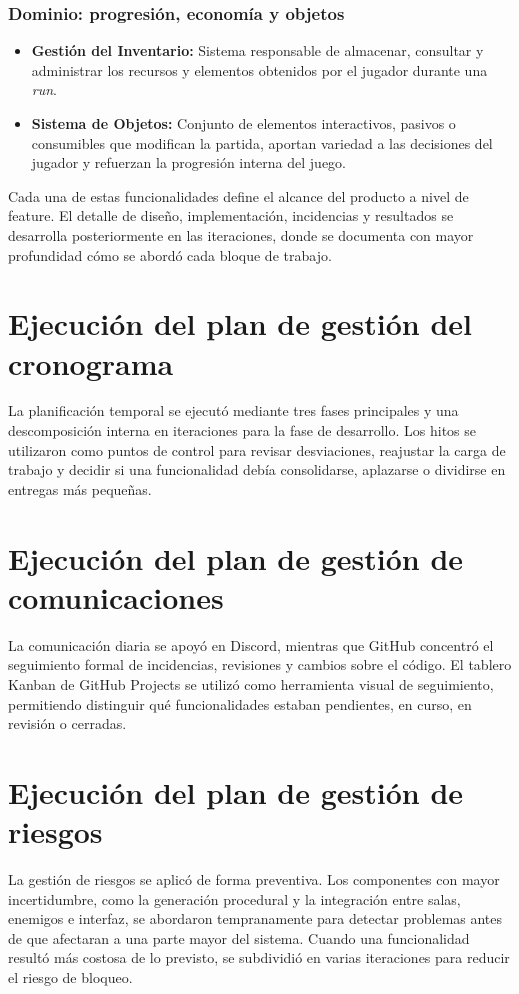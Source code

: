 \subsubsection{Dominio: progresión, economía y objetos}
\begin{itemize}
    \item \textbf{Gestión del Inventario:} Sistema responsable de almacenar, consultar y
    administrar los recursos y elementos obtenidos por el jugador durante una \textit{run}.
    \item \textbf{Sistema de Objetos:} Conjunto de elementos interactivos, pasivos o consumibles que
    modifican la partida, aportan variedad a las decisiones del jugador y refuerzan la
    progresión interna del juego.
\end{itemize}

Cada una de estas funcionalidades define el alcance del producto a nivel de feature. El
detalle de diseño, implementación, incidencias y resultados se desarrolla posteriormente
en las iteraciones, donde se documenta con mayor profundidad cómo se abordó cada bloque
de trabajo.

\section{Ejecución del plan de gestión del cronograma}
La planificación temporal se ejecutó mediante tres fases principales y una descomposición
interna en iteraciones para la fase de desarrollo. Los hitos se utilizaron como puntos de
control para revisar desviaciones, reajustar la carga de trabajo y decidir si una
funcionalidad debía consolidarse, aplazarse o dividirse en entregas más pequeñas.

\section{Ejecución del plan de gestión de comunicaciones}
La comunicación diaria se apoyó en Discord, mientras que GitHub concentró el seguimiento
formal de incidencias, revisiones y cambios sobre el código. El tablero Kanban de GitHub
Projects se utilizó como herramienta visual de seguimiento, permitiendo distinguir qué
funcionalidades estaban pendientes, en curso, en revisión o cerradas.

\section{Ejecución del plan de gestión de riesgos}
La gestión de riesgos se aplicó de forma preventiva. Los componentes con mayor
incertidumbre, como la generación procedural y la integración entre salas, enemigos e
interfaz, se abordaron tempranamente para detectar problemas antes de que afectaran a una
parte mayor del sistema. Cuando una funcionalidad resultó más costosa de lo previsto, se
subdividió en varias iteraciones para reducir el riesgo de bloqueo.

